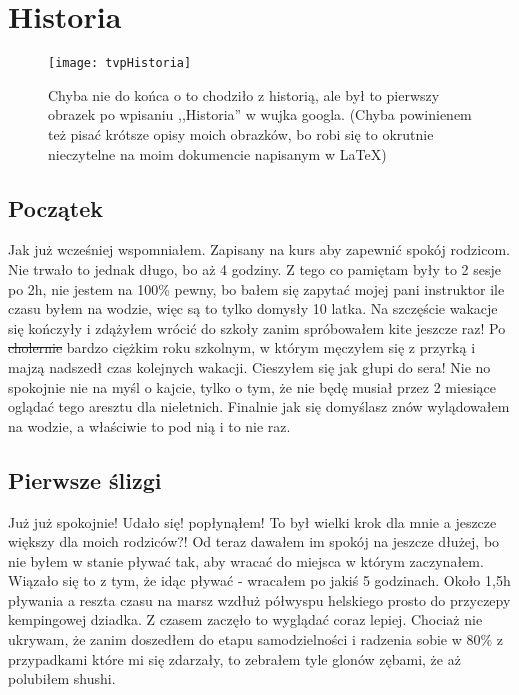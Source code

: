 \documentclass{article}
\begin{document}
	\section{Historia}
	
		\begin{figure}[h]
			\centering
			\texttt{[image: tvpHistoria]}
			\caption{Chyba nie do końca o to chodziło z historią, ale był to pierwszy obrazek po wpisaniu ,,Historia'' w wujka googla. (Chyba powinienem też pisać krótsze opisy moich obrazków, bo robi się to okrutnie nieczytelne na moim dokumencie napisanym w \LaTeX)}
		\end{figure}
	
	\subsection{Początek}
		Jak już wcześniej wspomniałem. Zapisany na kurs aby zapewnić spokój rodzicom. Nie trwało to jednak długo, bo aż 4 godziny. Z tego co pamiętam były to 2 sesje po 2h, nie jestem na 100\% pewny, bo bałem się zapytać mojej pani instruktor ile czasu byłem na wodzie, więc są to tylko domysły 10 latka. Na szczęście wakacje się kończyły i zdążyłem wrócić do szkoły zanim spróbowałem kite jeszcze raz! Po \sout{cholernie} bardzo ciężkim roku szkolnym, w którym męczyłem się z przyrką i majzą nadszedł czas kolejnych wakacji. Cieszyłem się jak głupi do sera! Nie no spokojnie nie na myśl o kajcie, tylko o tym, że nie będę musiał przez 2 miesiące oglądać tego aresztu dla nieletnich. Finalnie jak się domyślasz znów wylądowałem na wodzie, a właściwie to pod nią i to nie raz. \cite{wiedza_wlasna}
	
	\subsection{Pierwsze ślizgi}
	
		Już już spokojnie! Udało się! popłynąłem! To był wielki krok dla mnie a jeszcze większy dla moich rodziców?! Od teraz dawałem im spokój na jeszcze dłużej, bo nie byłem w stanie pływać tak, aby wracać do miejsca w którym zaczynałem. Wiązało się to z tym, że idąc pływać - wracałem po jakiś 5 godzinach. Około 1,5h pływania a reszta czasu na marsz wzdłuż półwyspu helskiego prosto do przyczepy kempingowej dziadka. Z czasem zaczęło to wyglądać coraz lepiej. Chociaż nie ukrywam, że zanim doszedłem do etapu samodzielności i radzenia sobie w 80\% z przypadkami które mi się zdarzały, to zebrałem tyle glonów zębami, że aż polubiłem shushi. 
	
\end{document}
